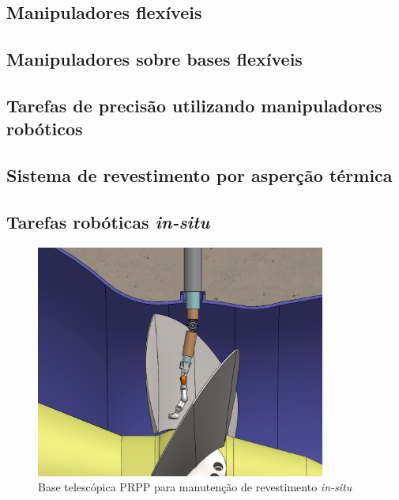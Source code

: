 \subsection{Manipuladores flexíveis}

\subsection{Manipuladores sobre bases flexíveis}

\subsection{Tarefas de precisão utilizando manipuladores robóticos}

\subsection{Sistema de revestimento por asperção térmica} \label{sec::hvof}

\subsection{Tarefas robóticas \textit{in-situ}} \label{sec::insitu}



\begin{figure}[h]
	\centering 
 	\includegraphics[width=0.85\textwidth]{figs/base_telesc_turbina}
 	\caption{Base telescópica PRPP para manutenção de revestimento
 	\textit{in-situ}}
 	\label{fig::base_telesc_turbina}
\end{figure}

